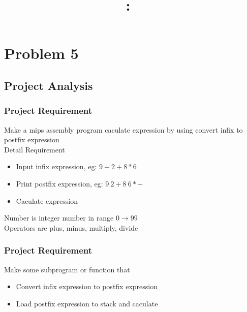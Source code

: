 \documentclass[a4paper]{article}
\title{
	\vspace{2in}
	\textbf{\hmwkClass:\ \hmwkTitle}
	\textmd{}\\
	\vspace{0.1in}\large{\textit{\hmwkClassInstructor}}
	\vspace{3in}
}
\author{\textbf{\hmwkAuthorName}}
\date{} %
\begin{document}
\maketitle



\newpage
\tableofcontents
\newpage



\section{Problem 5}

\subsection{Project Analysis}

\subsubsection{Project Requirement}
Make a mips assembly program caculate expression by using convert infix to postfix expression\\
Detail Requirement\\
	\begin{itemize}
		\item{Input infix expression, eg: $9 + 2 + 8 * 6$}
		\item{Print postfix expression, eg: $9\ 2 + 8\ 6 * +$}
		\item{Caculate expression}
	\end{itemize}

Number is integer number in range $0 \rightarrow 99$\\
Operators are plus, minus, multiply,  divide\\

\subsubsection{Project Requirement}
	Make some subprogram or function that
	\begin{itemize}
		\item{Convert infix expression to postfix expression}
		\item{Load postfix expression to stack and caculate}
	\end{itemize}
\end{document}
